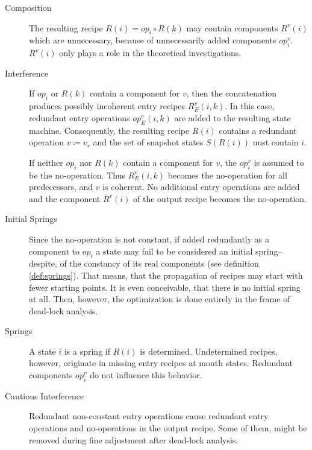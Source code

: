 \documentclass[12pt,a4paper]{scrartcl}
\begin{document}
\begin{description}
\item [Composition]

    The resulting recipe $R(i) = op_i\circ R(k)$ may contain components
    $R^v(i)$ which are unnecessary, because of unnecessarily added components
    $op^v_i$. $R^v(i)$ only plays a role in the theoretical investigations.

\item [Interference]

    If $op_i$ or $R(k)$ contain a component for $v$, then the concatenation
    produces possibly incoherent entry recipes $R^v_E(i,k)$.  In this case,
    redundant entry operations $op_E^v(i,k)$ are added to the resulting state
    machine. Consequently, the resulting recipe $R(i)$ contains a redundant
    operation $v\coloneqq v_r$ and the set of snapshot states $S(R(i))$ uust
    contain $i$.

    If neither $op_i$ nor $R(k)$ contain a component for $v$, the $op^v_i$ is
    assumed to be the no-operation. Thus $R_E^v(i,k)$ becomes the no-operation
    for all predecessors, and $v$ is coherent. No additional entry
    operations are added and the component $R^v(i)$ of the output recipe
    becomes the no-operation.

\item [Initial Springs]

    Since the no-operation is not constant, if added redundantly as a component
    to $op_i$ a state may fail to be considered an initial spring--despite, of
    the constancy of its real components (see definition \ref{def:springs}).
    That means, that the propagation of recipes may start with fewer starting
    points. It is even conceivable, that there is no initial spring at all.
    Then, however, the optimization is done entirely in the frame of dead-lock
    analysis.

\item [Springs]

    A state $i$ is a spring if $R(i)$ is determined. Undetermined recipes,
    however, originate in missing entry recipes at mouth states. Redundant
    components $op^v_i$ do not influence this behavior.

\item [Cautious Interference]

    Redundant non-constant entry operations cause redundant entry operations
    and no-operations in the output recipe. Some of them, might be removed
    during fine adjustment after dead-lock analysis.

\end{description}
\end{document}
